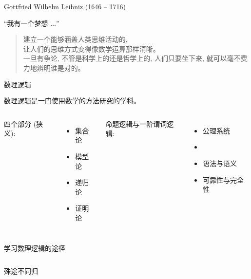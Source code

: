 \begin{frame}{Gottfried Wilhelm Leibniz (1646 -- 1716)}
\end{frame}

\begin{frame}{``我有一个梦想 $\ldots$''}
  \begin{quote}
    建立一个能够涵盖人类思维活动的,\\
    让人们的思维方式变得像数学运算那样清晰。\\[8pt]

    一旦有争论, 不管是科学上的还是哲学上的,
    人们只要坐下来,
    就可以毫不费力地辨明谁是对的。
  \end{quote}

  \vspace{0.80cm}
  \begin{quote}
    \centerline{}
  \end{quote}
\end{frame}

\begin{frame}{数理逻辑}
  \centerline{数理逻辑是一门使用数学的方法研究的学科。}
  \vspace{0.80cm}

  \begin{columns}
    四个部分 (狭义):
      \begin{itemize}
	\item 集合论
	\item 模型论
	\item 递归论
	\item 证明论
      \end{itemize}
    命题逻辑与一阶谓词逻辑:
      \begin{itemize}
	\item 公理系统
	\item {}
	\item 语法与语义
	\item 可靠性与完全性
      \end{itemize}
  \end{columns}
\end{frame}

\begin{frame}{学习数理逻辑的途径}
  \begin{columns}
  \end{columns}
\end{frame}

\begin{frame}{殊途不同归}
\end{frame}
